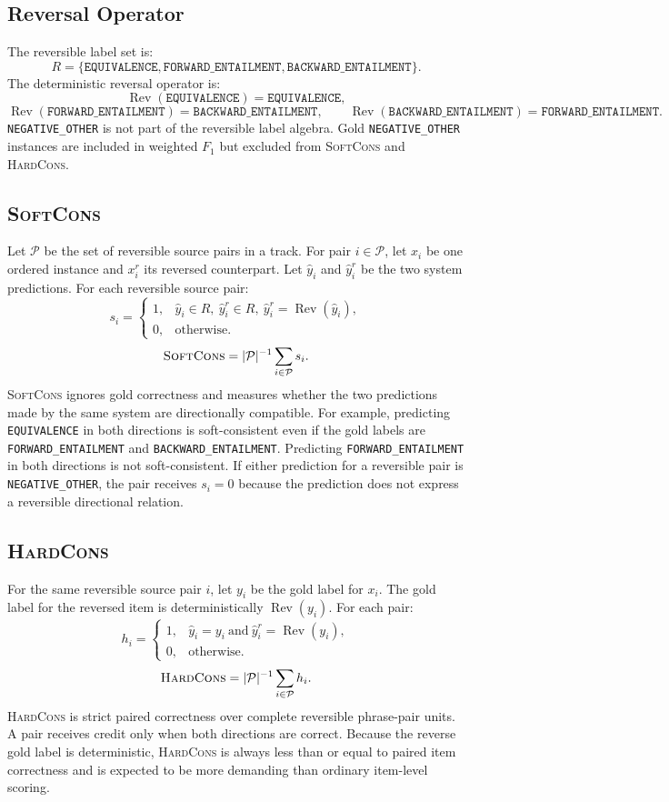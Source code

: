 \documentclass[10pt]{article}
\newcommand{\SoftCons}{\textsc{SoftCons}}
\newcommand{\HardCons}{\textsc{HardCons}}
\newcommand{\Rev}{\operatorname{Rev}}
\begin{document}
\subsection{Reversal Operator}

The reversible label set is:
\[
R=\{\texttt{EQUIVALENCE},\texttt{FORWARD\_ENTAILMENT},
\texttt{BACKWARD\_ENTAILMENT}\}.
\]
The deterministic reversal operator is:
\[
\Rev(\texttt{EQUIVALENCE})=\texttt{EQUIVALENCE},
\]
\[
\Rev(\texttt{FORWARD\_ENTAILMENT})=\texttt{BACKWARD\_ENTAILMENT}, \qquad
\Rev(\texttt{BACKWARD\_ENTAILMENT})=\texttt{FORWARD\_ENTAILMENT}.
\]
\texttt{NEGATIVE\_OTHER} is not part of the reversible label algebra.
Gold \texttt{NEGATIVE\_OTHER} instances are included in weighted $F_1$ but excluded from \SoftCons{} and \HardCons{}.

\subsection{\SoftCons{}}

Let $\mathcal{P}$ be the set of reversible source pairs in a track.
For pair $i\in\mathcal{P}$, let $x_i$ be one ordered instance and $x_i^r$ its reversed counterpart.
Let $\hat{y}_i$ and $\hat{y}_i^r$ be the two system predictions.
For each reversible source pair:
\[
s_i =
\begin{cases}
1, & \hat{y}_i\in R,\ \hat{y}_i^r\in R,\ \hat{y}_i^r=\Rev(\hat{y}_i),\\
0, & \text{otherwise.}
\end{cases}
\]
\[
\SoftCons{}=|\mathcal{P}|^{-1}\sum_{i\in\mathcal{P}}s_i .
\]
\SoftCons{} ignores gold correctness and measures whether the two predictions made by the same system are directionally compatible.
For example, predicting \texttt{EQUIVALENCE} in both directions is soft-consistent even if the gold labels are \texttt{FORWARD\_ENTAILMENT} and \texttt{BACKWARD\_ENTAILMENT}.
Predicting \texttt{FORWARD\_ENTAILMENT} in both directions is not soft-consistent.
If either prediction for a reversible pair is \texttt{NEGATIVE\_OTHER}, the pair receives $s_i=0$ because the prediction does not express a reversible directional relation.

\subsection{\HardCons{}}

For the same reversible source pair $i$, let $y_i$ be the gold label for $x_i$.
The gold label for the reversed item is deterministically $\Rev(y_i)$.
For each pair:
\[
h_i =
\begin{cases}
1, & \hat{y}_i=y_i\ \text{and}\ \hat{y}_i^r=\Rev(y_i),\\
0, & \text{otherwise.}
\end{cases}
\]
\[
\HardCons{}=|\mathcal{P}|^{-1}\sum_{i\in\mathcal{P}}h_i .
\]
\HardCons{} is strict paired correctness over complete reversible phrase-pair units.
A pair receives credit only when both directions are correct.
Because the reverse gold label is deterministic, \HardCons{} is always less than or equal to paired item correctness and is expected to be more demanding than ordinary item-level scoring.
\end{document}
